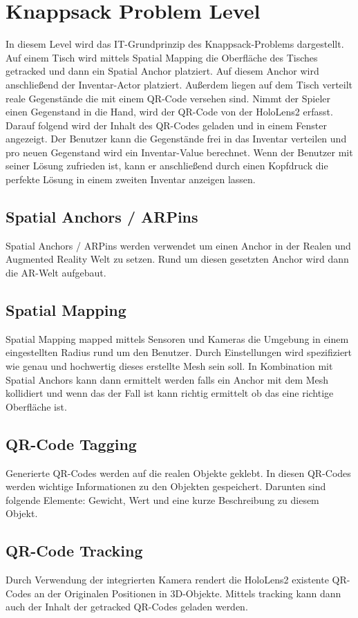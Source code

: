 \section{Knappsack Problem Level}
In diesem Level wird das IT-Grundprinzip des Knappsack-Problems dargestellt.
Auf einem Tisch wird mittels Spatial Mapping die Oberfläche des Tisches
getracked und dann ein Spatial Anchor platziert. Auf diesem Anchor wird
anschließend der Inventar-Actor platziert. Außerdem liegen auf dem Tisch
verteilt reale Gegenstände die mit einem QR-Code versehen sind. Nimmt der
Spieler einen Gegenstand in die Hand, wird der QR-Code von der HoloLens2
erfasst. Darauf folgend wird der Inhalt des QR-Codes geladen und in einem
Fenster angezeigt. Der Benutzer kann die Gegenstände frei in das Inventar
verteilen und pro neuen Gegenstand wird ein Inventar-Value berechnet.
Wenn der Benutzer mit seiner Lösung zufrieden ist, kann er anschließend
durch einen Kopfdruck die perfekte Lösung in einem zweiten Inventar anzeigen
lassen.

\subsection{Spatial Anchors / ARPins}
Spatial Anchors / ARPins werden verwendet um einen Anchor in der Realen und
Augmented Reality Welt zu setzen. Rund um diesen gesetzten Anchor wird dann die
AR-Welt aufgebaut.

\subsection{Spatial Mapping}
Spatial Mapping mapped mittels Sensoren und Kameras die Umgebung in einem
eingestellten Radius rund um den Benutzer. Durch Einstellungen wird spezifiziert
wie genau und hochwertig dieses erstellte Mesh sein soll. In Kombination mit
Spatial Anchors kann dann ermittelt werden falls ein Anchor mit dem Mesh kollidiert
und wenn das der Fall ist kann richtig ermittelt ob das eine richtige Oberfläche ist.

\subsection{QR-Code Tagging}
Generierte QR-Codes werden auf die realen Objekte geklebt. In diesen QR-Codes werden
wichtige Informationen zu den Objekten gespeichert. Darunten sind folgende Elemente:
Gewicht, Wert und eine kurze Beschreibung zu diesem Objekt.

\subsection{QR-Code Tracking}
Durch Verwendung der integrierten Kamera rendert die HoloLens2 existente QR-Codes an
der Originalen Positionen in 3D-Objekte. Mittels tracking kann dann auch der Inhalt
der getracked QR-Codes geladen werden.

